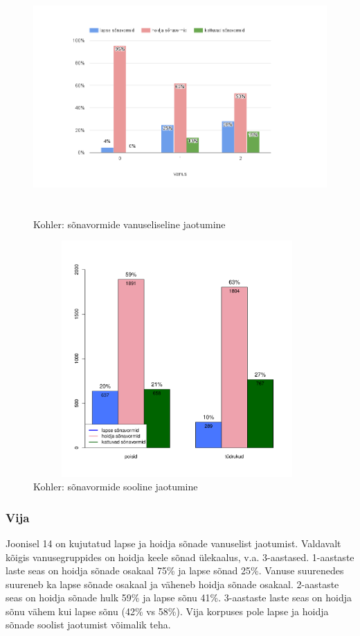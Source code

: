 \documentclass[12pt]{article}
\begin{document}
\begin{figure}[H]
    \centering
    \includegraphics[width=12cm, height=9cm]{kohler_vanus_vormid}
    \caption{Kohler: sõnavormide vanuseliseline jaotumine}
\end{figure}

\begin{figure}[H]
    \centering
    \includegraphics[width=11cm, height=9cm]{kohler_sonavormid_sugu}
    \caption{Kohler: sõnavormide sooline jaotumine}
\end{figure}


\subsubsection{Vija}

Joonisel 14 on kujutatud lapse ja hoidja sõnade vanuselist jaotumist. Valdavalt kõigis vanusegruppides on hoidja keele sõnad ülekaalus, v.a. 3-aastased. 1-aastaste laste seas on hoidja sõnade osakaal 75\% ja lapse sõnad 25\%. Vanuse suurenedes suureneb ka lapse sõnade osakaal ja väheneb hoidja sõnade osakaal. 2-aastaste seas on hoidja sõnade hulk 59\% ja lapse sõnu 41\%. 3-aastaste laste seas on hoidja sõnu vähem kui lapse sõnu (42\% vs 58\%). Vija korpuses pole lapse ja hoidja sõnade soolist jaotumist võimalik teha.
\end{document}
